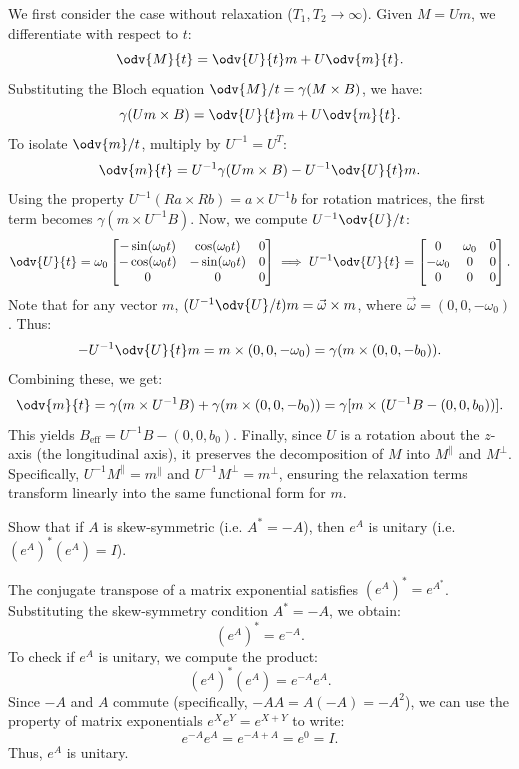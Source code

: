 \begin{solution}
  We first consider the case without relaxation ($T_1, T_2 \to \infty$). Given $M = Um$, we differentiate with respect to $t$:
  \[%
    \odv{M}{t} = \odv{U}{t}m + U\odv{m}{t}
  .\]%
  Substituting the Bloch equation $\odv{M}/{t} = \gamma(M \times B)$, we have:
  \[%
    \gamma(Um \times B) = \odv{U}{t}m + U\odv{m}{t}
  .\]%
  To isolate $\odv{m}/{t}$, multiply by $U^{-1} = U^T$:
  \[%
    \odv{m}{t} = U^{-1}\gamma(Um \times B) - U^{-1}\odv{U}{t}m
  .\]%
  Using the property $U^{-1}(Ra \times Rb) = a \times U^{-1}b$ for rotation matrices, the first term becomes $\gamma(m \times U^{-1}B)$. Now, we compute $U^{-1}\odv{U}/{t}$:
  \[%
    \odv{U}{t} = \omega_0 \begin{bmatrix}
      -\sin(\omega_0t) & \cos(\omega_0t) & 0 \\
      -\cos(\omega_0t) & -\sin(\omega_0t) & 0 \\
      0 & 0 & 0 \\
    \end{bmatrix} \implies U^{-1}\odv{U}{t} = \begin{bmatrix}
      0 & \omega_0 & 0 \\
      -\omega_0 & 0 & 0 \\
      0 & 0 & 0 \\
    \end{bmatrix}
  .\]%
  Note that for any vector $m$, $(U^{-1}\odv{U}/{t})m = \vec{\omega} \times m$, where $\vec{\omega} = (0, 0, -\omega_0)$. Thus:
  \[%
    -U^{-1}\odv{U}{t}m = m \times (0, 0, -\omega_0) = \gamma(m \times (0, 0, -b_0))
  .\]%
  Combining these, we get:
  \[%
    \odv{m}{t} = \gamma(m \times U^{-1}B) + \gamma(m \times (0, 0, -b_0)) = \gamma [m \times (U^{-1}B - (0, 0, b_0))]
  .\]%
  This yields $B_{\text{eff}} = U^{-1}B - (0, 0, b_0)$. Finally, since $U$ is a rotation about the $z$-axis (the longitudinal axis), it preserves the decomposition of $M$ into $M^\parallel$ and $M^\perp$. Specifically, $U^{-1}M^\parallel = m^\parallel$ and $U^{-1}M^\perp = m^\perp$, ensuring the relaxation terms transform linearly into the same functional form for $m$.
\end{solution}

\begin{problem}[3]
  Show that if $A$ is skew-symmetric (i.e. $A^* = -A$), then $e^A$ is unitary (i.e. $(e^A)^* (e^A) = I$).
\end{problem}

\begin{solution}
  The conjugate transpose of a matrix exponential satisfies $(e^A)^* = e^{A^*}$. Substituting the skew-symmetry condition $A^* = -A$, we obtain:
  \[%
    (e^A)^* = e^{-A}
  .\]%
  To check if $e^A$ is unitary, we compute the product:
  \[%
    (e^A)^* (e^A) = e^{-A} e^A
  .\]%
  Since $-A$ and $A$ commute (specifically, $-A A = A (-A) = -A^2$), we can use the property of matrix exponentials $e^X e^Y = e^{X+Y}$ to write:
  \[%
    e^{-A} e^A = e^{-A+A} = e^0 = I
  .\]%
  Thus, $e^A$ is unitary.
\end{solution}


